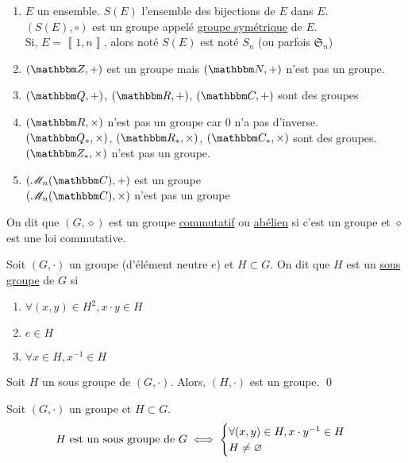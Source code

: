 \begin{exm}[(À connaître)]
	\begin{enumerate}
		\item $E$ un ensemble. $S(E)$ l'ensemble des bijections de $E$ dans $E$.\\
			$\left( S(E), \circ \right)$ est un groupe appelé \underline{groupe symétrique} de $E$.\\
			Si, $E = \left\llbracket 1, n \right\rrbracket$, alors noté $S(E)$ est noté $S_n$ (ou parfois $\mathfrak{S}_n$)
		\item $(\Z, +)$ est un groupe mais $(\N,+)$ n'est pas un groupe.
		\item $(\Q, +)$, $(\R, +)$, $(\C, +)$ sont des groupes
		\item $(\R, \times)$ n'est pas un groupe car $0$ n'a pas d'inverse.\\
			$(\Q_*,\times)$, $(\R_*, \times)$, $(\C_*, \times)$ sont des groupes.\\
			$(\Z_*, \times)$ n'est pas un groupe.
		\item $(\mathcal{M}_n(\C), +)$ est un groupe\\
			$(\mathcal{M}_n(\C), \times)$ n'est pas un groupe
	\end{enumerate}
\end{exm}

\begin{defn}
	On dit que $(G,\diamond)$ est un groupe \underline{commutatif} ou \underline{abélien} si c'est un groupe et $\diamond$ est une loi commutative.
\end{defn}

\begin{defn}
	Soit $(G, \cdot)$ un groupe (d'élément neutre $e$) et $H \subset G$. On dit que $H$ est un \underline{sous groupe} de $G$ si
	\begin{enumerate}
		\item $\forall (x,y) \in H^2, x\cdot y \in H$
		\item $e \in H$ 
		\item $\forall x \in H, x^{-1} \in H$
	\end{enumerate}
\end{defn}

\begin{prop}
	Soit $H$ un sous groupe de $(G, \cdot)$. Alors, $(H, \cdot)$ est un groupe.
	\qed
\end{prop}

\begin{prop}
	Soit $(G, \cdot)$ un groupe et $H \subset G$.\\
	\begin{align*}
		H \text{ est un sous groupe de } G \iff
		\begin{cases}
			\forall (x,y) \in H, x \cdot  y^{-1} \in H\\
			H \neq \varnothing
		\end{cases}
	\end{align*}
\end{prop}

